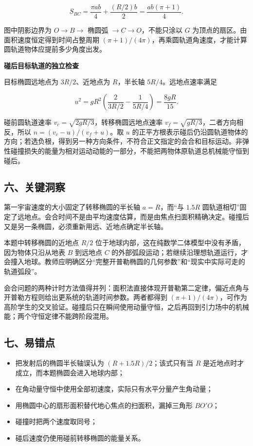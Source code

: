 \documentclass[12pt,a4paper,UTF8]{ctexart}
\newcommand{\tightlist}{\setlength{\itemsep}{0pt}\setlength{\parskip}{0pt}}
\begin{document}
\[S_{BC}=\frac{\pi ab}{4}+\frac{(R/2)b}{2}=\frac{ab(\pi+1)}4.\]

图中阴影边界为 \(O\to B\to\) 椭圆弧 \(\to C\to O\)，不能只涂以 \(G\)
为顶点的扇区。由面积速度恒定得到时间占整周期
\((\pi+1)/(4\pi)\)，再乘圆轨道角速度，才能计算圆轨道物体应提前多少角度出发。

\textbf{碰后目标轨道的独立检查}

目标椭圆远地点为 \(3R/2\)、近地点为 \(R\)，半长轴
\(5R/4\)。远地点速率满足

\[u^2=gR^2\left(\frac{2}{3R/2}-\frac{1}{5R/4}\right)=\frac{8gR}{15}.\]

碰前圆轨道速率 \(v_c=\sqrt{2gR/3}\)，转移椭圆远地点速率
\(v_f=\sqrt{gR/3}\)，二者方向相反，所以 \(n=(v_c-u)/(v_f+u)\)。取 \(u\)
的正平方根表示碰后仍沿圆轨道物体的方向；若选负根，得到另一种方向条件，不符合正文指定的会合和目标运动。非弹性碰撞损失的能量为相对运动动能的一部分，不能把两物体原轨道总机械能守恒到碰后。

\subsection{六、关键洞察}\label{ux516dux5173ux952eux6d1eux5bdf-2}

第一宇宙速度的大小固定了转移椭圆的半长轴 \(a=R\)，而``与 \(1.5R\)
圆轨道相切''固定了远地点。会合时间不是由平均速度估算，而是由焦点扫面积精确决定。碰撞后又是另一条椭圆，必须重新用远、近地点确定半长轴。

本题中转移椭圆的近地点 \(R/2\)
位于地球内部，这在纯数学二体模型中没有矛盾，因为物体只沿从地表 \(B\)
到远地点 \(C\)
的外部弧段运动；若继续沿理想轨道运行，才会撞入地球。教师应明确区分``完整开普勒椭圆的几何参数''和``现实中实际可走的轨道弧段''。

会合问题的两种计时方法值得并列：面积法直接体现开普勒第二定律，偏近点角与开普勒方程则给出更系统的轨道时间参数。两者都得到
\((\pi+1)/(4\pi)\)，可作为高阶学生的交叉验证。碰撞后只在瞬间使用动量守恒，之后再回到引力场中的机械能；两个守恒定律不能跨阶段混用。

\subsection{七、易错点}\label{ux4e03ux6613ux9519ux70b9-2}

\begin{itemize}
\tightlist
\item
  把发射后的椭圆半长轴误认为 \((R+1.5R)/2\)；该式只有当 \(R\)
  是近地点时才成立，而本题椭圆会进入地球内部；
\item
  在角动量守恒中使用全部初速度，实际只有水平分量产生角动量；
\item
  用椭圆中心的扇形面积替代地心焦点的扫面积，漏掉三角形 \(BO'O\)；
\item
  碰撞时把两个速度取同号；
\item
  碰后速度仍使用碰前转移椭圆的能量关系。
\end{itemize}
\end{document}
